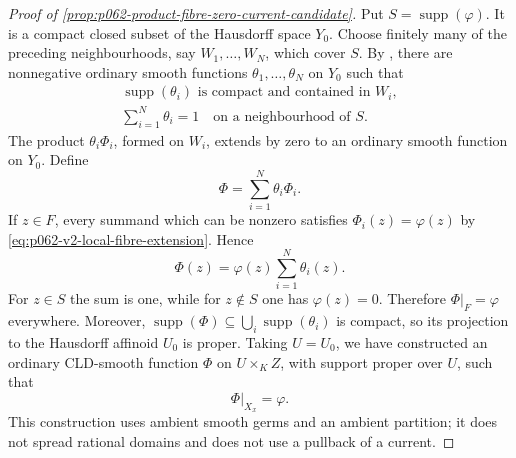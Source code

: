 \begin{proof}[Proof of \cref{prop:p062-product-fibre-zero-current-candidate}]
Put \(S=\operatorname{supp}(\varphi)\). It is a compact closed subset of
the Hausdorff space \(Y_0\). Choose finitely many of the preceding
neighbourhoods, say \(W_1,\ldots,W_N\), which cover \(S\). By
\cite[Corollary~15.2.9]{CLD25}, there are nonnegative ordinary smooth
functions \(\theta_1,\ldots,\theta_N\) on \(Y_0\) such that
\[
 \begin{gathered}
  \operatorname{supp}(\theta_i)\text{ is compact and contained in }W_i,\\
  \sum_{i=1}^N\theta_i=1\quad\text{on a neighbourhood of }S.
 \end{gathered}
\]
The product \(\theta_i\Phi_i\), formed on \(W_i\), extends by zero to an
ordinary smooth function on \(Y_0\). Define
\[
                         \Phi=\sum_{i=1}^N\theta_i\Phi_i.
\]
If \(z\in F\), every summand which can be nonzero satisfies
\(\Phi_i(z)=\varphi(z)\) by
\eqref{eq:p062-v2-local-fibre-extension}. Hence
\[
                         \Phi(z)=\varphi(z)
                                      \sum_{i=1}^N\theta_i(z).
\]
For \(z\in S\) the sum is one, while for \(z\notin S\) one has
\(\varphi(z)=0\). Therefore \(\Phi|_F=\varphi\) everywhere. Moreover,
\(
 \operatorname{supp}(\Phi)\subseteq
 \bigcup_i\operatorname{supp}(\theta_i)
\)
is compact, so its projection to the Hausdorff affinoid \(U_0\) is
proper. Taking \(U=U_0\), we have constructed an ordinary CLD-smooth
function \(\Phi\) on \(U\times_KZ\), with support proper over \(U\), such
that
\begin{equation}\label{eq:p062-spread-test-candidate}
                         \Phi|_{X_x}=\varphi.
\end{equation}
This construction uses ambient smooth germs and an ambient partition; it
does not spread rational domains and does not use a pullback of a current.


\end{proof}
